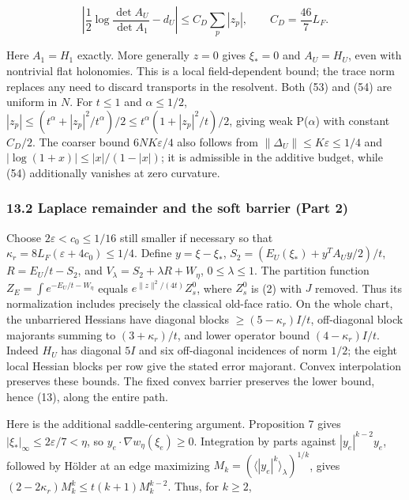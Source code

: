 \documentclass[11pt,a4paper]{article}
\begin{document}
\[\left|\frac12\log\frac{\det A_U}{\det A_1}-d_U\right|
\le C_D\sum_p|z_p|,\qquad C_D=\frac{46}{7}L_F.\tag{54}\]

Here \(A_1=H_1\) exactly. More generally \(z=0\) gives \(\xi_*=0\) and
\(A_U=H_U\), even with nontrivial flat holonomies. This is a local
field-dependent bound; the trace norm replaces any need to discard
transports in the resolvent. Both (53) and (54) are uniform in \(N\).
For \(t\le1\) and \(\alpha\le1/2\),
\(|z_p|\le(t^\alpha+|z_p|^2/t^\alpha)/2 \le t^\alpha(1+|z_p|^2/t)/2\),
giving weak P(\(\alpha\)) with constant \(C_D/2\). The coarser bound
\(6NK\varepsilon/4\) also follows from
\(\|\Delta_U\|\le K\varepsilon\le1/4\) and
\(|\log(1+x)|\le|x|/(1-|x|)\); it is admissible in the additive budget,
while (54) additionally vanishes at zero curvature.

\hypertarget{laplace-remainder-and-the-soft-barrier-part-2}{%
\subsubsection{13.2 Laplace remainder and the soft barrier (Part
2)}\label{laplace-remainder-and-the-soft-barrier-part-2}}

Choose \(2\varepsilon<c_0\le1/16\) still smaller if necessary so that
\(\kappa_r=8L_F(\varepsilon+4c_0)\le1/4\). Define \(y=\xi-\xi_*\),
\(S_2=(E_U(\xi_*)+y^TA_Uy/2)/t\), \(R=E_U/t-S_2\), and
\(V_\lambda=S_2+\lambda R+W_\eta\), \(0\le\lambda\le1\). The partition
function \(Z_E=\int e^{-E_U/t-W_\eta}\) equals
\(e^{\|z\|^2/(4t)}Z_s^0\), where \(Z_s^0\) is (2) with \(J\) removed.
Thus its normalization includes precisely the classical old-face ratio.
On the whole chart, the unbarriered Hessians have diagonal blocks
\(\ge(5-\kappa_r)I/t\), off-diagonal block majorants summing to
\((3+\kappa_r)/t\), and lower operator bound \((4-\kappa_r)I/t\). Indeed
\(H_U\) has diagonal \(5I\) and six off-diagonal incidences of norm
\(1/2\); the eight local Hessian blocks per row give the stated error
majorant. Convex interpolation preserves these bounds. The fixed convex
barrier preserves the lower bound, hence (13), along the entire path.

Here is the additional saddle-centering argument. Proposition 7 gives
\(|\xi_*|_\infty\le2\varepsilon/7<\eta\), so
\(y_e\cdot\nabla w_\eta(\xi_e)\ge0\). Integration by parts against
\(|y_e|^{k-2}y_e\), followed by Hölder at an edge maximizing
\(M_k=(\langle|y_e|^k\rangle_\lambda)^{1/k}\), gives
\((2-2\kappa_r)M_k^k\le t(k+1)M_k^{k-2}\). Thus, for \(k\ge2\),
\end{document}
